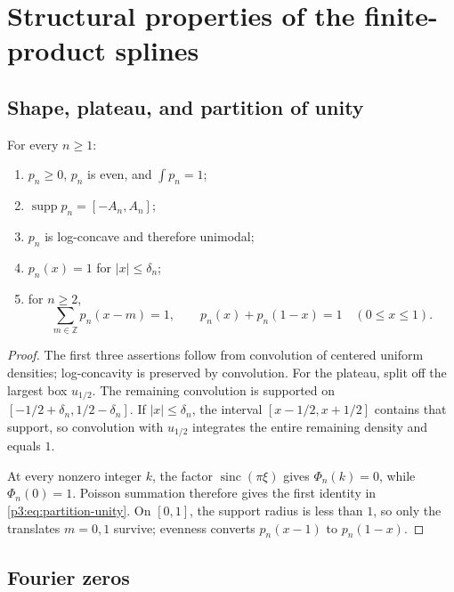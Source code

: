 \documentclass[11pt,oneside]{article}
\numberwithin{equation}{section}
\theoremstyle{definition}
\theoremstyle{remark}
\newcommand{\sinc}{\operatorname{sinc}}
\newcommand{\supp}{\operatorname{supp}}
\begin{document}
\section{Structural properties of the finite-product splines}
\label{p3:sec:properties}

\subsection{Shape, plateau, and partition of unity}

\begin{proposition}
\label{p3:prop:basic-geometry}
For every $n\ge1$:
\begin{enumerate}[label=(\roman*),leftmargin=2.1em]
\item $p_n\ge0$, $p_n$ is even, and $\int p_n=1$;
\item $\supp p_n=[-A_n,A_n]$;
\item $p_n$ is log-concave and therefore unimodal;
\item $p_n(x)=1$ for $|x|\le\delta_n$;
\item for $n\ge2$,
\begin{equation}
 \sum_{m\in\mathbb Z}p_n(x-m)=1,
 \qquad
 p_n(x)+p_n(1-x)=1\quad(0\le x\le1).
 \label{p3:eq:partition-unity}
\end{equation}
\end{enumerate}
\end{proposition}

\begin{proof}
The first three assertions follow from convolution of centered uniform densities;
log-concavity is preserved by convolution.  For the plateau, split off the largest box
$u_{1/2}$.  The remaining convolution is supported on
$[-1/2+\delta_n,1/2-\delta_n]$.  If $|x|\le\delta_n$, the interval
$[x-1/2,x+1/2]$ contains that support, so convolution with $u_{1/2}$ integrates the
entire remaining density and equals $1$.

At every nonzero integer $k$, the factor $\sinc(\pi\xi)$ gives $\Phi_n(k)=0$, while
$\Phi_n(0)=1$.  Poisson summation therefore gives the first identity in
\cref{p3:eq:partition-unity}.  On $[0,1]$, the support radius is less than $1$, so only the
translates $m=0,1$ survive; evenness converts $p_n(x-1)$ to $p_n(1-x)$.
\end{proof}

\subsection{Fourier zeros}
\end{document}
